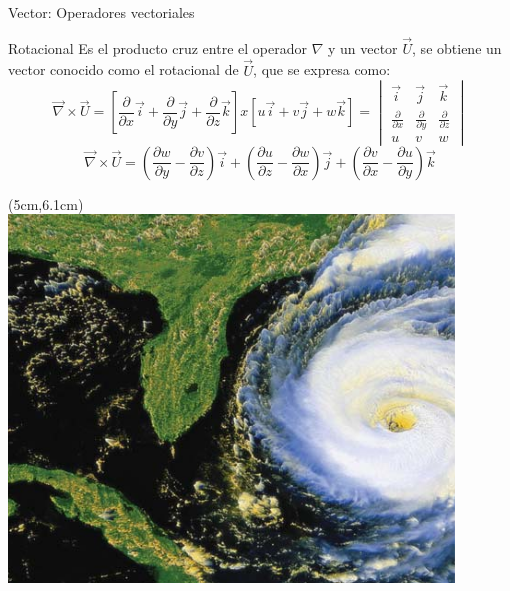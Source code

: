 \documentclass [xcolor=svgnames, t] {beamer}
\begin{document}
\begin{frame}{Vector: Operadores vectoriales}
\vspace{-0.5cm}
\begin{block}{Rotacional}
Es el producto cruz entre el operador $\nabla$ y un vector $\vec{U}$, se obtiene un vector conocido como el rotacional de $\vec{U}$, que se expresa como:
$$
\vec{\nabla} \times \vec{U} = \left[ \frac{\partial }{\partial x}\vec{i} + \frac{\partial }{\partial y}\vec{j} + \frac{\partial }{\partial z}\vec{k} \right] x [u\vec{i}+v\vec{j}+w\vec{k}] = \begin{vmatrix} \vec{i} & \vec{j} & \vec{k} \\ \frac{\partial}{\partial x} & \frac{\partial}{\partial y} & \frac{\partial}{\partial z} \\ u & v & w \end{vmatrix} 
$$
\begin{equation}
\vec{\nabla} \times \vec{U} = \left ( \frac{\partial w}{\partial y}-\frac{\partial v}{\partial z}\right )\vec{i} + \left ( \frac{\partial u}{\partial z}-\frac{\partial w}{\partial x}\right )\vec{j} + \left ( \frac{\partial v}{\partial x}-\frac{\partial u}{\partial y}\right )\vec{k}
\label{rot}
\end{equation}
\begin{textblock*}{3.5cm}(5cm,6.1cm) %
\includegraphics[width=\textwidth]{rota}
\end{textblock*}
\end{block}
\end{frame}
\end{document}
